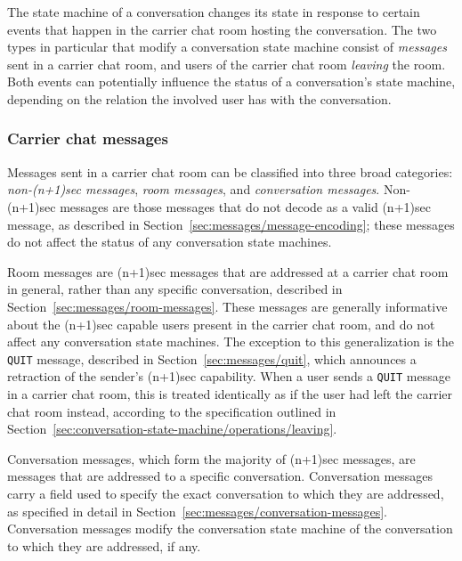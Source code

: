 \documentclass{article}
\def\message#1{\texttt{#1}}
\begin{document}
The state machine of a conversation changes its state in response to certain events that happen in the carrier chat room hosting the conversation.
The two types in particular that modify a conversation state machine consist of \emph{messages} sent in a carrier chat room, and users of the carrier chat room \emph{leaving} the room.
Both events can potentially influence the status of a conversation's state machine, depending on the relation the involved user has with the conversation.


\subsubsection{Carrier chat messages}
\label{sec:conversation-state-machine/operations/messages}

Messages sent in a carrier chat room can be classified into three broad categories: \emph{non-(n+1)sec messages}, \emph{room messages}, and \emph{conversation messages}.
Non-(n+1)sec messages are those messages that do not decode as a valid (n+1)sec message, as described in Section~\ref{sec:messages/message-encoding}; these messages do not affect the status of any conversation state machines.

Room messages are (n+1)sec messages that are addressed at a carrier chat room in general, rather than any specific conversation, described in Section~\ref{sec:messages/room-messages}.
These messages are generally informative about the (n+1)sec capable users present in the carrier chat room, and do not affect any conversation state machines.
The exception to this generalization is the \message{QUIT} message, described in Section~\ref{sec:messages/quit}, which announces a retraction of the sender's (n+1)sec capability.
When a user sends a \message{QUIT} message in a carrier chat room, this is treated identically as if the user had left the carrier chat room instead, according to the specification outlined in Section~\ref{sec:conversation-state-machine/operations/leaving}.

Conversation messages, which form the majority of (n+1)sec messages, are messages that are addressed to a specific conversation.
Conversation messages carry a field used to specify the exact conversation to which they are addressed, as specified in detail in Section~\ref{sec:messages/conversation-messages}.
Conversation messages modify the conversation state machine of the conversation to which they are addressed, if any.
\end{document}
